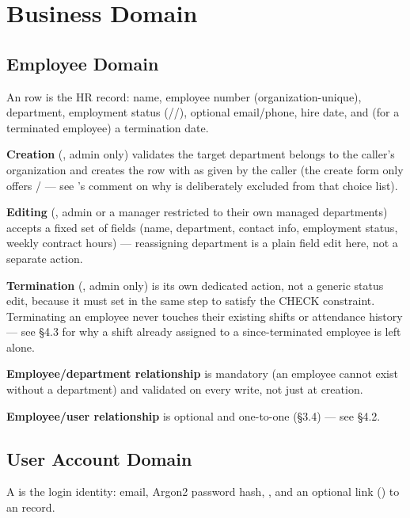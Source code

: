\chapter{Business Domain}

\section{Employee Domain}

An  row is the HR record: name, employee number
(organization-unique), department, employment status
(//), optional email/phone,
hire date, and (for a terminated employee) a termination date.

\textbf{Creation} (, admin only)
validates the target department belongs to the caller's organization
and creates the row with  as given by the
caller (the create form only offers / ---
see 's comment on why  is
deliberately excluded from that choice list).

\textbf{Editing} (, admin or a manager
restricted to their own managed departments) accepts a fixed set of
fields (name, department, contact info, employment status, weekly
contract hours) --- reassigning department is a plain field edit here,
not a separate action.

\textbf{Termination} (, admin only)
is its own dedicated action, not a generic status edit, because it must
set  in the same step to satisfy the
 CHECK constraint.
Terminating an employee never touches their existing shifts or
attendance history --- see \S4.3 for why a shift already assigned to a
since-terminated employee is left alone.

\textbf{Employee/department relationship} is mandatory (an employee
cannot exist without a department) and validated on every write, not
just at creation.

\textbf{Employee/user relationship} is optional and one-to-one (\S3.4)
--- see \S4.2.

\section{User Account Domain}

A  is the login identity: email, Argon2 password hash,
, and an optional link () to an
 record.

